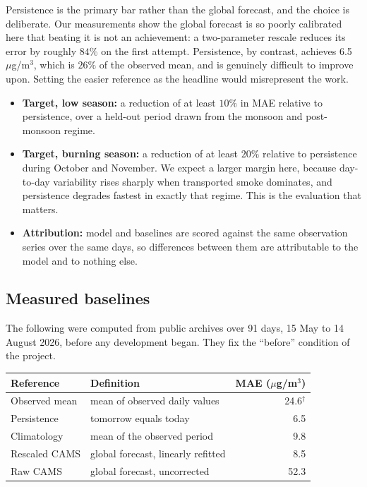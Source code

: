\documentclass[11pt,a4paper]{article}
\newcommand{\ObsMean}{24.6}
\newcommand{\PersMAE}{6.5}
\newcommand{\ClimMAE}{9.8}
\newcommand{\CamsMAE}{52.3}
\newcommand{\CamsFitMAE}{8.5}
\newcommand{\NDays}{91}
\begin{document}
Persistence is the primary bar rather than the global forecast,
and the choice is deliberate. Our measurements show the global
forecast is so poorly calibrated here that beating it is not an
achievement: a two-parameter rescale reduces its error by
roughly $84\%$ on the first attempt. Persistence, by contrast,
achieves \PersMAE~$\mu$g/m$^3$, which is $26\%$ of the observed
mean, and is genuinely difficult to improve upon. Setting the
easier reference as the headline would misrepresent the work.

\begin{itemize}[leftmargin=0.7cm]
  \item \textbf{Target, low season:} a reduction of at least
    $10\%$ in MAE relative to persistence, over a held-out
    period drawn from the monsoon and post-monsoon regime.
  \item \textbf{Target, burning season:} a reduction of at least
    $20\%$ relative to persistence during October and November.
    We expect a larger margin here, because day-to-day
    variability rises sharply when transported smoke dominates,
    and persistence degrades fastest in exactly that regime.
    This is the evaluation that matters.
  \item \textbf{Attribution:} model and baselines are scored
    against the same observation series over the same days, so
    differences between them are attributable to the model and
    to nothing else.
\end{itemize}

\subsection{Measured baselines}
The following were computed from public archives over
\NDays{} days, 15 May to 14 August 2026, before any development
began. They fix the ``before'' condition of the project.

\begin{center}
\begin{tabular}{llr}
\toprule
\textbf{Reference} & \textbf{Definition} &
  \textbf{MAE ($\mu$g/m$^3$)} \\
\midrule
Observed mean & mean of observed daily values &
  \ObsMean$^{\dagger}$ \\
Persistence & tomorrow equals today & \PersMAE \\
Climatology & mean of the observed period & \ClimMAE \\
Rescaled CAMS & global forecast, linearly refitted &
  \CamsFitMAE \\
Raw CAMS & global forecast, uncorrected & \CamsMAE \\
\bottomrule
\end{tabular}
\end{center}
\end{document}

